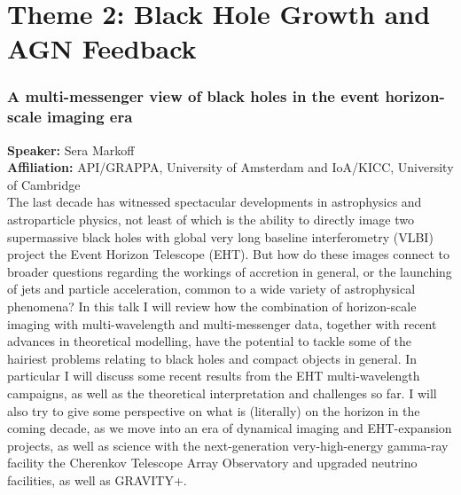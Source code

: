 \hypertarget{abs-day-friday}{}

\section*{Theme 2: Black Hole Growth and AGN Feedback}

\hypertarget{abs-11}{}
\subsubsection*{A multi-messenger view of black holes in the event horizon-scale imaging era}
\textbf{Speaker:} Sera Markoff \invitedbadge{}\\
\textbf{Affiliation:} API/GRAPPA, University of Amsterdam and IoA/KICC, University of Cambridge\\
The last decade has witnessed spectacular developments in astrophysics and astroparticle physics, not least of which is the ability to directly image two supermassive black holes with global very long baseline interferometry (VLBI) project the Event Horizon Telescope (EHT). But how do these images connect to broader questions regarding the workings of accretion in general, or the launching of jets and particle acceleration, common to a wide variety of astrophysical phenomena? In this talk I will review how the combination of horizon-scale imaging with multi-wavelength and multi-messenger data, together with recent advances in theoretical modelling, have the potential to tackle some of the hairiest problems relating to black holes and compact objects in general. In particular I will discuss some recent results from the EHT multi-wavelength campaigns, as well as the theoretical interpretation and challenges so far. I will also try to give some perspective on what is (literally) on the horizon in the coming decade, as we move into an era of dynamical imaging and EHT-expansion projects, as well as science with the next-generation very-high-energy gamma-ray facility the Cherenkov Telescope Array Observatory and upgraded neutrino facilities, as well as GRAVITY+.

\hypertarget{abs-26}{}
